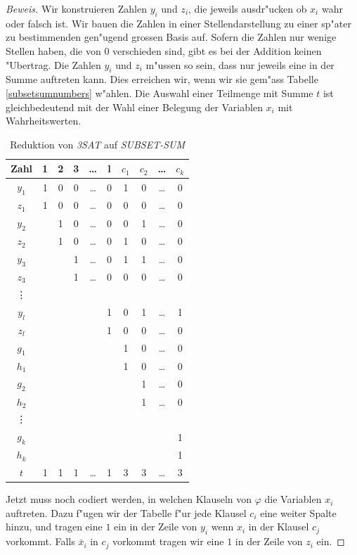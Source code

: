 \begin{proof}[Beweis]
Wir konstruieren Zahlen $y_i$ und $z_i$, die jeweils ausdr"ucken
ob $x_i$ wahr oder falsch ist. Wir bauen die Zahlen in einer
Stellendarstellung zu einer sp"ater zu bestimmenden gen"ugend
grossen Basis auf. Sofern die Zahlen nur wenige Stellen haben, die 
von $0$ verschieden sind, gibt es bei der Addition keinen "Ubertrag.
Die Zahlen $y_i$ und $z_i$ m"ussen so sein, dass nur jeweils eine
in der Summe auftreten kann. Dies erreichen wir, wenn wir
sie gem"ass Tabelle \ref{subsetsumnumbers} w"ahlen.
Die Auswahl einer Teilmenge mit Summe $t$ ist gleichbedeutend
mit der Wahl einer Belegung der Variablen $x_i$ mit Wahrheitswerten.
\begin{table}
\begin{center}
\begin{tabular}{|c|ccccc|cccc|}
\hline
Zahl&1&2&3&\dots&l&$c_1$&$c_2$&\dots&$c_k$\\
\hline
$y_1$&1&0&0&\dots&0&1&0&\dots&0\\
$z_1$&1&0&0&\dots&0&0&0&\dots&0\\
$y_2$& &1&0&\dots&0&0&1&\dots&0\\
$z_2$& &1&0&\dots&0&1&0&\dots&0\\
$y_3$& & &1&\dots&0&1&1&\dots&0\\
$z_3$& & &1&\dots&0&0&0&\dots&0\\
\vdots&& & &     & & & &     & \\
$y_l$& & & &     &1&0&1&\dots&1\\
$z_l$& & & &     &1&0&0&\dots&0\\
\hline
$g_1$& & & &     & &1&0&\dots&0\\
$h_1$& & & &     & &1&0&\dots&0\\
$g_2$& & & &     & & &1&\dots&0\\
$h_2$& & & &     & & &1&\dots&0\\
\vdots&& & &     & & & &     & \\
$g_k$& & & &     & & & &     &1\\
$h_k$& & & &     & & & &     &1\\
\hline
$t$  &1&1&1&\dots&1&3&3&\dots&3\\
\hline
\end{tabular}
\end{center}
\caption{Reduktion von \textsl{3SAT} auf
\textsl{SUBSET-SUM}\label{subsetsumtable}}
\end{table}

Jetzt muss noch codiert werden, in welchen Klauseln von $\varphi$ 
die Variablen $x_i$ auftreten. Dazu f"ugen wir der Tabelle f"ur jede
Klausel $c_i$ eine weiter Spalte hinzu, und tragen eine $1$ ein
in der Zeile von $y_i$ wenn $x_i$ in der Klausel $c_j$ vorkommt.
Falls $\bar x_i$ in $c_j$ vorkommt tragen wir eine $1$ in der Zeile
von $z_i$ ein.


\end{proof}

